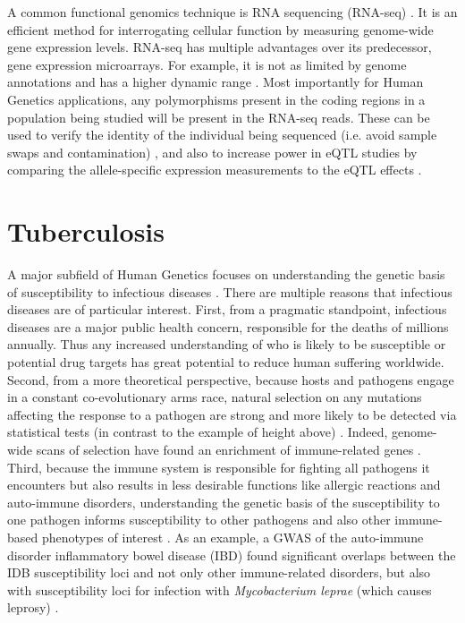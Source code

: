 A common functional genomics technique is RNA sequencing (RNA-seq) \citep{Wang2009, Oshlack2010, Waern2011}. It
is an efficient method for interrogating cellular function by
measuring genome-wide gene expression levels. RNA-seq has multiple
advantages over its predecessor, gene expression microarrays. For
example, it is not as limited by genome annotations and has a higher
dynamic range \citep{Marioni2008, Zhao2014}. Most importantly for Human Genetics applications, any
polymorphisms present in the coding regions in a population being
studied will be present in the RNA-seq reads. These can be used to
verify the identity of the individual being sequenced (i.e. avoid
sample swaps and contamination) \citep{Jun2012}, and also to increase power in eQTL
studies by comparing the allele-specific expression measurements to
the eQTL effects \citep{Castel2015, VandeGeijn2015}.

\section{Tuberculosis}

A major subfield of Human Genetics focuses on understanding the
genetic basis of susceptibility to infectious diseases \citep{Casanova2007, Chapman2012, Novembre2012, Manry2013}. There are
multiple reasons that infectious diseases are of particular
interest. First, from a pragmatic standpoint, infectious diseases are
a major public health concern, responsible for the deaths of millions
annually. Thus any increased understanding of who is likely to be
susceptible or potential drug targets has great potential to reduce
human suffering worldwide. Second, from a more theoretical
perspective, because hosts and pathogens engage in a constant
co-evolutionary arms race, natural selection on any mutations
affecting the response to a pathogen are strong and more likely to be
detected via statistical tests (in contrast to the example of height
above) \citep{Hamblin2002, Prugnolle2005, Novembre2012, Fumagalli2014, Mangano2014}. Indeed, genome-wide scans of selection have found an
enrichment of immune-related genes \citep{Raj2013, Fumagalli2011, Fumagalli2014}. Third,
because the immune system is responsible for fighting all pathogens it
encounters but also results in less desirable functions like allergic
reactions and auto-immune disorders, understanding the genetic basis
of the susceptibility to one pathogen informs susceptibility to other
pathogens and also other immune-based phenotypes of interest \citep{Vannberg2011, Raj2013}. As an
example, a GWAS of the auto-immune disorder inflammatory bowel disease
(IBD) found significant overlaps between the IDB susceptibility loci
and not only other immune-related disorders, but also with
susceptibility loci for infection with \emph{Mycobacterium leprae}
(which causes leprosy) \citep{Jostins2012}.

